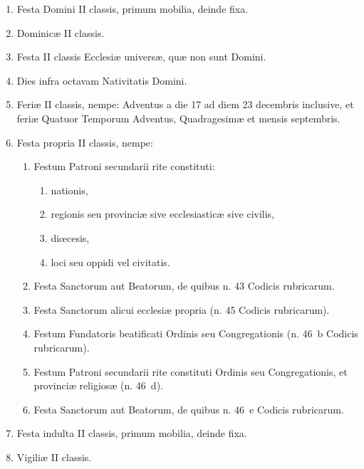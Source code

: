 \documentclass[vesperale_romanum.tex]{subfiles}
\begin{document}
 \begin{enumerate}[nosep]
\item Festa Domini II classis, primum mobilia, deinde fixa.
\item Dominicæ II classis.
\item Festa II classis Ecclesiæ universæ, quæ non sunt Domini.
\item Dies infra octavam Nativitatis Domini.
\item Feriæ II classis, nempe: Adventus a die 17 ad diem 23 decembris inclusive, et feriæ Quatuor Temporum Adventus, Quadragesimæ et mensis septembris.
\item Festa propria II classis, nempe:
\begin{enumerate}[nosep,label=\arabic*.]
\item Festum Patroni secundarii rite constituti:
\begin{enumerate}[nosep,label=\alph*.]
\item nationis,
\item regionis seu provinciæ sive ecclesiasticæ sive civilis,
\item diœcesis,
\item loci seu oppidi vel civitatis.
\end{enumerate}
\item Festa Sanctorum aut Beatorum, de quibus n. 43  Codicis rubricarum.
\item Festa Sanctorum alicui ecclesiæ propria (n. 45  Codicis rubricarum).
\item Festum Fundatoris beatificati Ordinis seu Congregationis (n. 46~b  Codicis rubricarum).
\item Festum Patroni secundarii rite constituti Ordinis seu Congregationis, et provinciæ religiosæ (n. 46~d).
\item Festa Sanctorum aut Beatorum, de quibus n. 46~e  Codicis rubricarum.
\end{enumerate}
\item Festa indulta II classis, primum mobilia, deinde fixa.
\item Vigiliæ II classis.
\end{enumerate}
\end{document}

